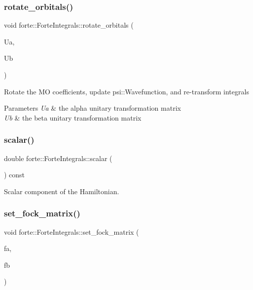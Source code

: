 \subsubsection{\texorpdfstring{rotate\+\_\+orbitals()}{rotate\_orbitals()}}
{\footnotesize\ttfamily void forte\+::\+Forte\+Integrals\+::rotate\+\_\+orbitals (\begin{DoxyParamCaption}\item[{std\+::shared\+\_\+ptr$<$ psi\+::\+Matrix $>$}]{Ua,  }\item[{std\+::shared\+\_\+ptr$<$ psi\+::\+Matrix $>$}]{Ub }\end{DoxyParamCaption})}

Rotate the MO coefficients, update psi\+::\+Wavefunction, and re-\/transform integrals 
\begin{DoxyParams}{Parameters}
{\em Ua} & the alpha unitary transformation matrix \\
\hline
{\em Ub} & the beta unitary transformation matrix \\
\hline
\end{DoxyParams}
\mbox{\label{classforte_1_1_forte_integrals_a7e2dec148b4e6c3bbd918df8025f8329}} 
\subsubsection{\texorpdfstring{scalar()}{scalar()}}
{\footnotesize\ttfamily double forte\+::\+Forte\+Integrals\+::scalar (\begin{DoxyParamCaption}{ }\end{DoxyParamCaption}) const}



Scalar component of the Hamiltonian. 

\mbox{\label{classforte_1_1_forte_integrals_ade72331435cd82f97fa2c97bb4b117c4}} 
\subsubsection{\texorpdfstring{set\+\_\+fock\+\_\+matrix()}{set\_fock\_matrix()}}
{\footnotesize\ttfamily void forte\+::\+Forte\+Integrals\+::set\+\_\+fock\+\_\+matrix (\begin{DoxyParamCaption}\item[{psi\+::\+Shared\+Matrix}]{fa,  }\item[{psi\+::\+Shared\+Matrix}]{fb }\end{DoxyParamCaption})}



